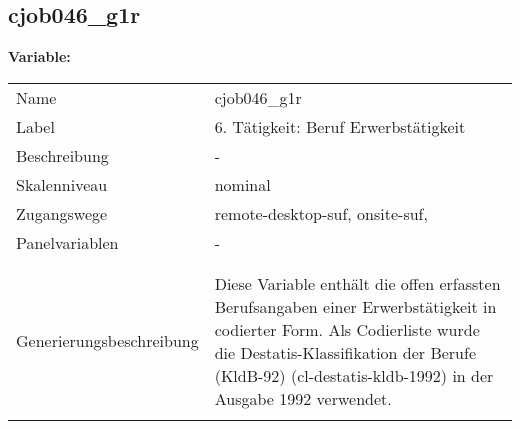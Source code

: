 	
	
	\subsection{cjob046\_g1r}
	\label{subSection:cjob046_g1r}

	\noindent\textbf{Variable:}\\
		\begin{tabular}{lL{11.3cm}}
			\label{tableVariable:cjob046_g1r}
			Name & cjob046\_g1r \\
			Label & 6. Tätigkeit: Beruf Erwerbstätigkeit \\
			Beschreibung & - \\
			Skalenniveau & nominal \\
			Zugangswege &
				remote-desktop-suf,
				onsite-suf,
 \\
			Panelvariablen & -
			 \\
			 \\
 \\
					Generierungsbeschreibung & Diese Variable enthält die offen erfassten Berufsangaben einer Erwerbstätigkeit in codierter Form. Als Codierliste wurde die Destatis-Klassifikation der Berufe (KldB-92) (cl-destatis-kldb-1992) in der Ausgabe 1992 verwendet. 
				 \\	
			 \\
		\end{tabular}






